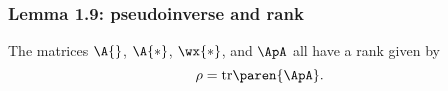 \subsubsection{Lemma 1.9: pseudoinverse and rank}
The matrices $\A{}$, $\A{*}$, $\wx{*}$, and $\ApA$ all have a rank given by
\begin{equation}
  \rho = \text{tr} \paren{\ApA}. 
\end{equation}




\endinput